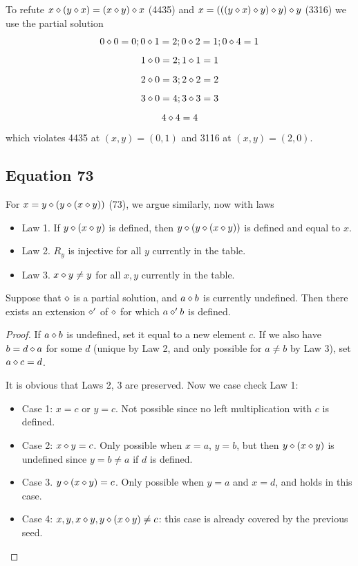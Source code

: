 To refute $x \diamond (y \diamond x) = (x \diamond y) \diamond x$ (4435) and $x = (((y \diamond x) \diamond y) \diamond y) \diamond y$ (3316) we use the partial solution
$$ 0 \diamond 0 = 0; 0 \diamond 1 = 2; 0 \diamond 2 = 1; 0 \diamond 4 = 1$$
$$ 1 \diamond 0 = 2; 1 \diamond 1 = 1$$
$$ 2 \diamond 0 = 3; 2 \diamond 2 = 2$$
$$ 3 \diamond 0 = 4; 3 \diamond 3 = 3$$
$$ 4 \diamond 4 = 4$$
which violates 4435 at $(x,y)=(0,1)$ and 3116 at $(x,y)=(2,0).$

\subsection{Equation 73}

For $x = y \diamond (y \diamond (x \diamond y))$ (73), we argue similarly, now with laws
\begin{itemize}
\item Law 1.  If $y \diamond (x \diamond y)$ is defined, then $y \diamond (y \diamond (x \diamond y))$ is defined and equal to $x$.
\item Law 2.  $R_y$ is injective for all $y$ currently in the table.
\item Law 3.  $x \diamond y \neq y$ for all $x,y$ currently in the table.
\end{itemize}

\begin{lemma}[73 extension]\label{73-extension}  Suppose that $\diamond$ is a partial solution, and $a \diamond b$ is currently undefined.  Then there exists an extension $\diamond'$ of $\diamond$ for which $a \diamond' b$ is defined.
\end{lemma}

\begin{proof} If $a \diamond b$ is undefined, set it equal to a new element $c$.  If we also have $b = d \diamond a$ for some $d$ (unique by Law 2, and only possible for $a \neq b$ by Law 3), set $a \diamond c = d$.

It is obvious that Laws 2, 3 are preserved.   Now we case check Law 1:
\begin{itemize}
\item Case 1: $x=c$ or $y=c$.  Not possible since no left multiplication with $c$ is defined.
\item Case 2: $x \diamond y = c$.  Only possible when $x = a$, $y = b$, but then $y \diamond (x \diamond y)$ is undefined since $y = b \neq a$ if $d$ is defined.
\item Case 3. $y \diamond (x \diamond y) = c$.  Only possible when $y=a$ and $x=d$, and holds in this case.
\item Case 4: $x, y, x \diamond y, y \diamond (x \diamond y) \neq c$: this case is already covered by the previous seed.
\end{itemize}
\end{proof}

